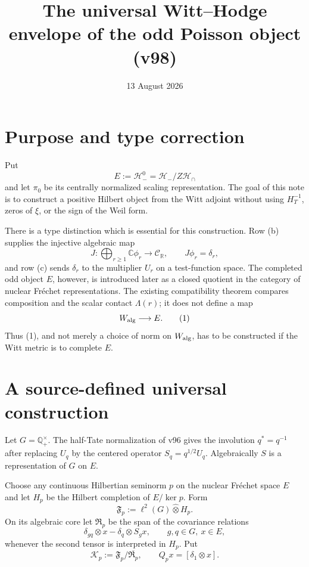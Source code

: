 \documentclass[11pt]{article}
\title{The universal Witt--Hodge envelope of the odd Poisson object (v98)}
\date{13 August 2026}
\begin{document}
\maketitle

\section{Purpose and type correction}

Put
\[
 E:=\mathcal H_-^0=\mathcal H_-/Z\mathcal H_\cap
\]
and let $\pi_0$ be its centrally normalized scaling representation.  The
goal of this note is to construct a positive Hilbert object from the Witt
adjoint without using $H_T^{-1}$, zeros of $\xi$, or the sign of the Weil
form.

There is a type distinction which is essential for this construction.
Row (b) supplies the injective algebraic map
\[
 J:\bigoplus_{r\ge1}\mathbb C\phi_r\longrightarrow\mathcal C_{\mathbb R},
 \qquad J\phi_r=\delta_r,
\]
and row (c) sends $\delta_r$ to the multiplier $U_r$ on a test-function
space.  The completed odd object $E$, however, is introduced later as a
closed quotient in the category of nuclear Fr\'echet representations.
The existing compatibility theorem compares composition and the scalar
contact $\Lambda(r)$; it does not define a map
\begin{equation}
       W_{\rm alg}\longrightarrow E.                 \tag{1}
\end{equation}
Thus (1), and not merely a choice of norm on $W_{\rm alg}$, has to be
constructed if the Witt metric is to complete $E$.

\section{A source-defined universal construction}

Let $G=\mathbb Q_+^\times$.  The half-Tate normalization of v96 gives the
involution $q^*=q^{-1}$ after replacing $U_q$ by the centered operator
$S_q=q^{1/2}U_q$.  Algebraically $S$ is a representation of $G$ on $E$.

Choose any continuous Hilbertian seminorm $p$ on the nuclear Fr\'echet
space $E$ and let $H_p$ be the Hilbert completion of $E/\ker p$.  Form
\[
 \mathfrak F_p:=\ell^2(G)\widehat\otimes H_p.
\]
On its algebraic core let $\mathfrak R_p$ be the span of the covariance
relations
\begin{equation}
 \delta_{gq}\otimes x-\delta_q\otimes S_gx,
 \qquad g,q\in G,\ x\in E,                           \tag{2}
\end{equation}
whenever the second tensor is interpreted in $H_p$.  Put
\begin{equation}
 \mathscr K_p:=\mathfrak F_p/\overline{\mathfrak R_p},
 \qquad Q_p x=[\delta_1\otimes x].                   \tag{3}
\end{equation}
\end{document}
